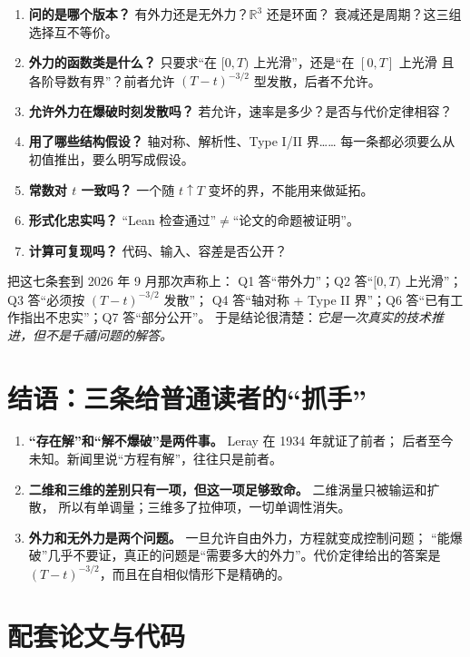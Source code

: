 \documentclass[11pt,a4paper]{article}
\begin{document}
\begin{enumerate}[label=\textbf{Q\arabic*.},leftmargin=2.2em]
\item \textbf{问的是哪个版本？} 有外力还是无外力？$\mathbb{R}^3$ 还是环面？
      衰减还是周期？这三组选择互不等价。
\item \textbf{外力的函数类是什么？} 只要求“在 $[0,T)$ 上光滑”，还是“在 $[0,T]$ 上光滑
      且各阶导数有界”？前者允许 $(T-t)^{-3/2}$ 型发散，后者不允许。
\item \textbf{允许外力在爆破时刻发散吗？} 若允许，速率是多少？是否与代价定律相容？
\item \textbf{用了哪些结构假设？} 轴对称、解析性、Type I/II 界……
      每一条都必须要么从初值推出，要么明写成假设。
\item \textbf{常数对 $t$ 一致吗？} 一个随 $t\uparrow T$ 变坏的界，不能用来做延拓。
\item \textbf{形式化忠实吗？} “Lean 检查通过”$\ne$“论文的命题被证明”。
\item \textbf{计算可复现吗？} 代码、输入、容差是否公开？
\end{enumerate}

把这七条套到 2026 年 9 月那次声称上：
Q1 答“带外力”；Q2 答“$[0,T)$ 上光滑”；Q3 答“必须按 $(T-t)^{-3/2}$ 发散”；
Q4 答“轴对称 + Type II 界”；Q6 答“已有工作指出不忠实”；Q7 答“部分公开”。
于是结论很清楚：\emph{它是一次真实的技术推进，但不是千禧问题的解答。}

\section{结语：三条给普通读者的“抓手”}

\begin{enumerate}[leftmargin=1.8em]
\item \textbf{“存在解”和“解不爆破”是两件事。} Leray 在 1934 年就证了前者；
      后者至今未知。新闻里说“方程有解”，往往只是前者。
\item \textbf{二维和三维的差别只有一项，但这一项足够致命。} 二维涡量只被输运和扩散，
      所以有单调量；三维多了拉伸项，一切单调性消失。
\item \textbf{外力和无外力是两个问题。} 一旦允许自由外力，方程就变成控制问题；
      “能爆破”几乎不要证，真正的问题是“需要多大的外力”。代价定律给出的答案是
      $(T-t)^{-3/2}$，而且在自相似情形下是精确的。
\end{enumerate}

\appendix

\section{配套论文与代码}
\end{document}
